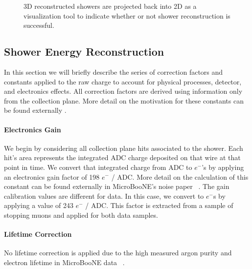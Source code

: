 \begin{figure}[h!] %
\centering
{}
\caption{3D reconstructed showers are projected back into 2D as a visualization tool to indicate whether or not shower reconstruction is successful. }
\label{fig:showers}
\end{figure}

\subsection{Shower Energy Reconstruction}
\label{sec:ereco}
\par In this section we will briefly describe the series of correction factors and constants applied to the raw charge to account for physical processes, detector, and electronics effects. All correction factors are derived using information only from the collection plane.  More detail on the motivation for these constants can be found externally \cite{bib:davidc_energycalibration}\cite{bib:davidc_recomb}.

\paragraph{Electronics Gain} 
We begin by considering all collection plane hits associated to the shower.  Each hit's area represents the integrated ADC charge deposited on that wire at that point in time.  We convert that integrated charge from ADC to $e^-$'s by applying an electronics gain factor of 198 $e^-$ / ADC. More detail on the calculation of this constant can be found externally in MicroBooNE's noise paper ~\cite{bib:noise}.  
\noindent The gain calibration values are different for data. In this case, we convert to $e^-$s by applying a value of 243 $e^-$ / ADC.  This factor is extracted from a sample of stopping muons and applied for both data samples.   
\paragraph{ Lifetime Correction} No lifetime correction is applied due to the high measured argon purity and electron lifetime in MicroBooNE data ~\cite{bib:purity}. 

